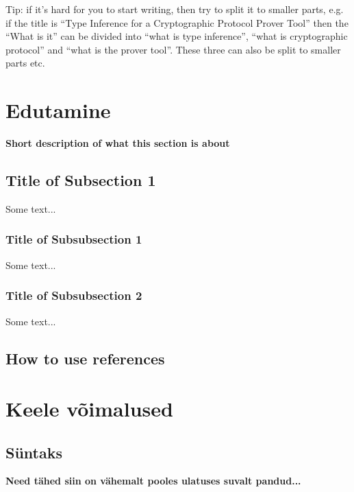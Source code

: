 \documentclass[12pt]{article}
\newcommand\peatykk[1]{
  \clearpage
  \section{#1}}
\newcommand\markus[1]{\textcolor{roheline}{\textbf{#1}}}
\begin{document}
    Tip: if it's hard for you to start writing, then try to split it to smaller parts, e.g. if the title is ``Type Inference for a Cryptographic Protocol Prover Tool'' then the ``What is it'' can be divided into ``what is type inference'', ``what is cryptographic protocol'' and ``what is the prover tool''. These three can also be split to smaller parts etc.
  \peatykk{Edutamine} 
    \markus{Short description of what this section is about}
    \subsection{Title of Subsection 1}
      Some text...
      \subsubsection{Title of Subsubsection 1}
        Some text...
      \subsubsection{Title of Subsubsection 2}
        Some text...
    \subsection{How to use references} \label{sec:using_ref}
  \peatykk{Keele võimalused}
    \subsection{Süntaks}
      \markus{Need tähed siin on vähemalt pooles ulatuses suvalt pandud...}
\end{document}

